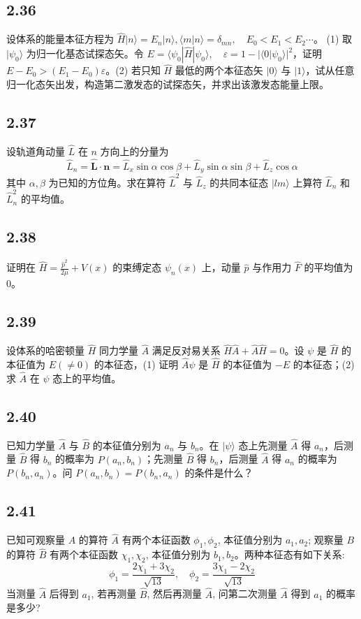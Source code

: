\subsection{2.36}
设体系的能量本征方程为 $\hat{H} | n \rangle = E_n | n \rangle, \langle m | n \rangle = \delta_{mn}, \quad E_0 < E_1 < E_2 \cdots$。
(1) 取 $| \psi_0 \rangle$ 为归一化基态试探态矢。令 $E = \langle \psi_0 | \hat{H} | \psi_0 \rangle, \quad \varepsilon = 1 - | \langle 0 | \psi_0 \rangle |^2$，证明 $E - E_0 > (E_1 - E_0) \varepsilon$。(2) 若只知 $\hat{H}$ 最低的两个本征态矢 $| 0 \rangle$ 与 $| 1 \rangle$，试从任意归一化态矢出发，构造第二激发态的试探态矢，并求出该激发态能量上限。

\subsection{2.37}
设轨道角动量 $\hat{L}$ 在 $n$ 方向上的分量为
$$\hat{L}_n=\hat{\boldsymbol{L}}\cdot \boldsymbol{n}=\hat{L}_x\sin \alpha \cos \beta +\hat{L}_y\sin \alpha \sin \beta +\hat{L}_z\cos \alpha $$
其中 $\alpha, \beta$ 为已知的方位角。求在算符 $\hat{L}^2$ 与 $\hat{L}_z$ 的共同本征态 $| lm \rangle$ 上算符 $\hat{L}_n$ 和 $\hat{L}_n^2$ 的平均值。

\subsection{2.38}
证明在 $\hat{H} = \frac{\hat{p}^2}{2\mu} + V(x)$ 的束缚定态 $\psi_n (x)$ 上，动量 $\hat{p}$ 与作用力 $\hat{F}$ 的平均值为0。

\subsection{2.39}
设体系的哈密顿量 $\hat{H}$ 同力学量 $\hat{A}$ 满足反对易关系 $\hat{H} \hat{A} + \hat{A} \hat{H} = 0$。设 $\psi$ 是 $\hat{H}$ 的本征值为 $E(\neq 0)$ 的本征态，(1) 证明 $\hat{A} \psi$ 是 $\hat{H}$ 的本征值为 $-E$ 的本征态；(2) 求 $\hat{A}$ 在 $\psi$ 态上的平均值。

\subsection{2.40}
已知力学量 $\hat{A}$ 与 $\hat{B}$ 的本征值分别为 $a_n$ 与 $b_n$。在 $|\psi\rangle$ 态上先测量 $\hat{A}$ 得 $a_n$，后测量 $\hat{B}$ 得 $b_n$ 的概率为 $P(a_n, b_n)$；先测量 $\hat{B}$ 得 $b_n$，后测量 $\hat{A}$ 得 $a_n$ 的概率为 $P(b_n, a_n)$。问 $P(a_n, b_n) = P(b_n, a_n)$ 的条件是什么？

\subsection{2.41}
已知可观察量 $A$ 的算符 $\hat{A}$ 有两个本征函数 $\phi_1, \phi_2$, 本征值分别为 $a_1, a_2$; 观察量 $B$ 的算符 $\hat{B}$ 有两个本征函数 $\chi_1, \chi_2$, 本征值分别为 $b_1, b_2$。两种本征态有如下关系:
$$\phi_1 = \frac{2\chi_1 + 3\chi_2}{\sqrt{13}}, \quad \phi_2 = \frac{3\chi_1 - 2\chi_2}{\sqrt{13}}$$
当测量 $\hat{A}$ 后得到 $a_1$, 若再测量 $\hat{B}$, 然后再测量 $\hat{A}$, 问第二次测量 $\hat{A}$ 得到 $a_1$ 的概率是多少?

